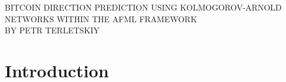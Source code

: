 \documentclass[12pt,a4paper,oneside]{article}
\begin{document}
\begin{center}
\textsc{BITCOIN DIRECTION PREDICTION USING KOLMOGOROV-ARNOLD NETWORKS WITHIN THE AFML FRAMEWORK}\\

\vspace{0.5cm}
\textsc{BY PETR TERLETSKIY}\\
\end{center}


\section{Introduction}\label{sec:introduction}
\end{document}
